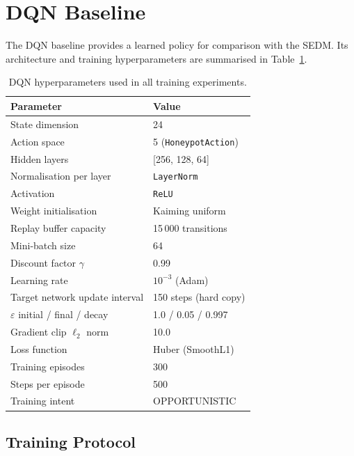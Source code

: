 \section{DQN Baseline}
\label{sec:dqn_baseline}

The DQN baseline provides a learned policy for comparison with the SEDM.
Its architecture and training hyperparameters are summarised in
Table~\ref{tab:hyperparams}.

\begin{table}[ht]
  \centering
  \caption{DQN hyperparameters used in all training experiments.}
  \label{tab:hyperparams}
  \begin{tabular}{ll}
    \toprule
    Parameter & Value \\
    \midrule
    State dimension & 24 \\
    Action space & 5 (\texttt{HoneypotAction}) \\
    Hidden layers & [256, 128, 64] \\
    Normalisation per layer & \texttt{LayerNorm} \\
    Activation & \texttt{ReLU} \\
    Weight initialisation & Kaiming uniform \\
    Replay buffer capacity & 15\,000 transitions \\
    Mini-batch size & 64 \\
    Discount factor $\gamma$ & 0.99 \\
    Learning rate & $10^{-3}$ (Adam) \\
    Target network update interval & 150 steps (hard copy) \\
    $\varepsilon$ initial / final / decay & 1.0 / 0.05 / 0.997 \\
    Gradient clip $\ell_2$ norm & 10.0 \\
    Loss function & Huber (SmoothL1) \\
    Training episodes & 300 \\
    Steps per episode & 500 \\
    Training intent & OPPORTUNISTIC \\
    \bottomrule
  \end{tabular}
\end{table}

\subsection{Training Protocol}

